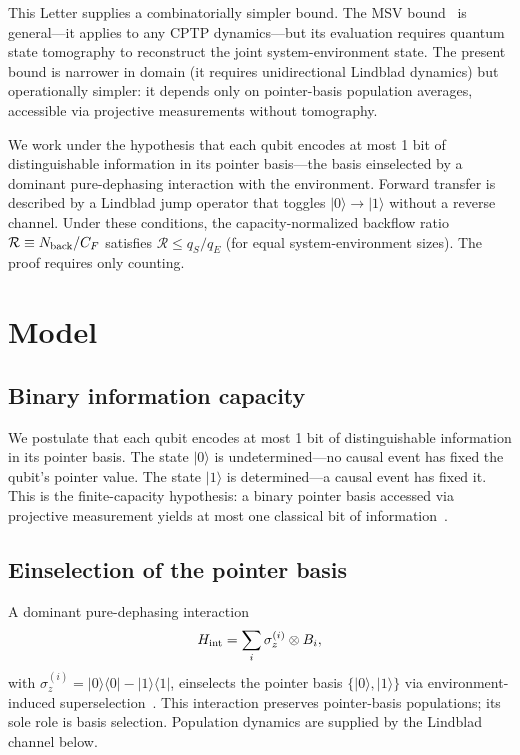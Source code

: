 \documentclass[aps,prl,twocolumn,superscriptaddress,hyperref]{revtex4-2}
\begin{document}
This Letter supplies a combinatorially simpler bound. The MSV bound~\cite{Megier:2021} is general---it applies to any CPTP dynamics---but its evaluation requires quantum state tomography to reconstruct the joint system-environment state. The present bound is narrower in domain (it requires unidirectional Lindblad dynamics) but operationally simpler: it depends only on pointer-basis population averages, accessible via projective measurements without tomography.

We work under the hypothesis that each qubit encodes at most 1 bit of distinguishable information in its pointer basis---the basis einselected by a dominant pure-dephasing interaction with the environment. Forward transfer is described by a Lindblad jump operator that toggles $|0\rangle \to |1\rangle$ without a reverse channel. Under these conditions, the capacity-normalized backflow ratio $\mathcal{R} \equiv N_{\rm back}/C_F$ satisfies $\mathcal{R} \leq q_S/q_E$ (for equal system-environment sizes). The proof requires only counting.

\section{Model}
\label{sec:model}

\subsection{Binary information capacity}

We postulate that each qubit encodes at most 1 bit of distinguishable information in its pointer basis. The state $|0\rangle$ is undetermined---no causal event has fixed the qubit's pointer value. The state $|1\rangle$ is determined---a causal event has fixed it. This is the finite-capacity hypothesis: a binary pointer basis accessed via projective measurement yields at most one classical bit of information~\cite{Zurek:2003}.

\subsection{Einselection of the pointer basis}

A dominant pure-dephasing interaction
\begin{equation}
H_{\rm int} = \sum_{i} \sigma_z^{(i)} \otimes B_i,
\label{eq:hint}
\end{equation}
with $\sigma_z^{(i)} = |0\rangle\langle 0| - |1\rangle\langle 1|$, einselects the pointer basis $\{|0\rangle,|1\rangle\}$ via environment-induced superselection~\cite{Zurek:2003}. This interaction preserves pointer-basis populations; its sole role is basis selection. Population dynamics are supplied by the Lindblad channel below.
\end{document}
